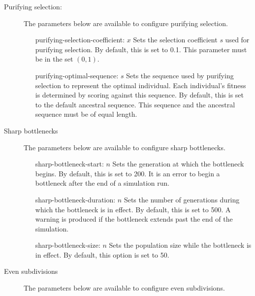 \documentclass{article}
\begin{document}
        \begin{description}
          \item[Purifying selection:] The parameters below are available to
	  configure purifying selection.

            \begin{enumerate}
              \item[purifying-selection-coefficient: $x$]
              Sets the selection coefficient $s$ used for purifying selection.
              By default, this is set to 0.1. This parameter must be in the set
              $(0, 1)$.

              \item[purifying-optimal-sequence: $s$]
              Sets the sequence used by purifying selection to represent the
              optimal individual. Each individual's fitness is determined by
              scoring against this sequence. By default, this is set to the
              default ancestral sequence. This sequence and the ancestral
              sequence must be of equal length.
            \end{enumerate}

          \item[Sharp bottlenecks] The parameters below are available to
	  configure sharp bottlenecks.

            \begin{enumerate}
              \item[sharp-bottleneck-start: $n$]
              Sets the generation at which the bottleneck begins. By default,
              this is set to 200. It is an error to begin a bottleneck after the
              end of a simulation run.

              \item[sharp-bottleneck-duration: $n$]
              Sets the number of generations during which the bottleneck is in
              effect. By default, this is set to 500. A warning is produced if
              the bottleneck extends past the end of the simulation.

              \item[sharp-bottleneck-size: $n$]
              Sets the population size while the bottleneck is in effect. By
              default, this option is set to 50.
            \end{enumerate}

          \item[Even subdivisions] The parameters below are available to
	  configure even subdivisions.


\end{description}
\end{document}
